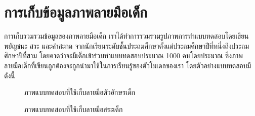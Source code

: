 \documentclass[12pt,oneside,openright,a4paper]{cpe-thai-project}
\begin{document}
\section{การเก็บข้อมูลภาพลายมือเด็ก}
การเก็บรวมรวมข้อมูลของภาพลายมือเด็ก เราได้ทำการรวมรวมรูปภาพการทำแบบทดสอบโดยเขียนพยัญชนะ สระ และคำสะกด 
จากนักเรียนระดับชั้นประถมศึกษาตั้งแต่ประถมศึกษาปีที่หนึ่งถึงประถมศึกษาปีที่สาม โดยคาดว่าจะมีเด็กเข้าร่วมทำแบบทดสอบประมาณ 1000 
คนโดยประมาณ ซึ่งภาพลายมือเด็กที่เขียนถูกต้องจะถูกนำมาใช้ในการเรียนรู้ของตัวโมเดลของเรา โดยตัวอย่างแบบทดสอบมีดังนี้
\begin{figure}[!ht]\centering
  \setlength{\fboxrule}{0.2mm} %
  \setlength{\fboxsep}{1cm}
  \caption{ภาพแบบทดสอบที่ใช้เก็บลายมือตัวอักษรเด็ก}\label{fig:system}
    
\end{figure}
\newpage
\begin{figure}[!ht]\centering
  \setlength{\fboxrule}{0.2mm} %
  \setlength{\fboxsep}{1cm}
  \caption{ภาพแบบทดสอบที่ใช้เก็บลายมือสระเด็ก}\label{fig:system}
    
\end{figure}
\end{document}
